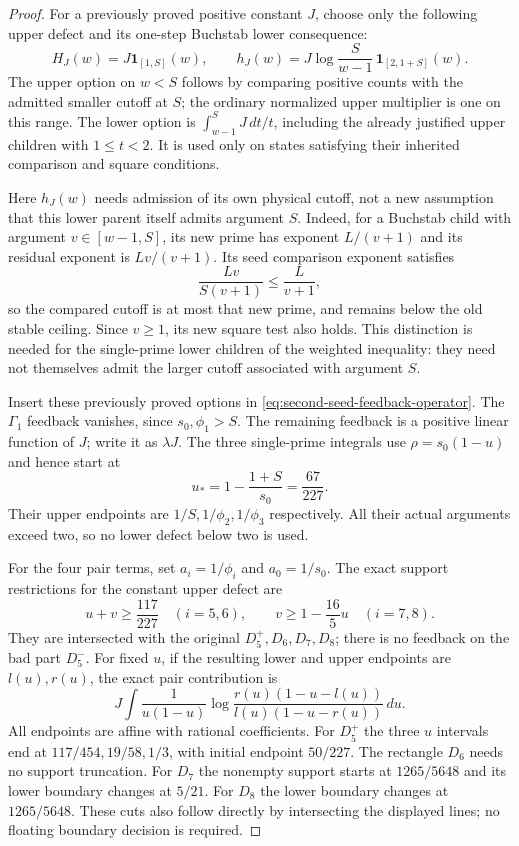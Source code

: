\begin{proof}
For a previously proved positive constant $J$, choose only the
following upper defect and its one-step Buchstab lower consequence:
\[
 H_J(w)=J\mathbf1_{[1,S]}(w),\qquad
 h_J(w)=J\log\frac{S}{w-1}\,\mathbf1_{[2,1+S]}(w).
\]
The upper option on $w<S$ follows by comparing positive counts
with the admitted smaller cutoff at $S$; the ordinary normalized
upper multiplier is one on this range. The lower option is
$\int_{w-1}^S J\,dt/t$, including the already justified upper
children with $1\le t<2$. It is used only on states satisfying
their inherited comparison and square conditions.

Here $h_J(w)$ needs admission of its own physical cutoff, not a
new assumption that this lower parent itself admits argument $S$.
Indeed, for a Buchstab child with argument $v\in[w-1,S]$, its new
prime has exponent $L/(v+1)$ and its residual exponent is
$Lv/(v+1)$. Its seed comparison exponent satisfies
\[
 \frac{Lv}{S(v+1)}\le\frac{L}{v+1},
\]
so the compared cutoff is at most that new prime, and remains
below the old stable ceiling. Since $v\ge1$, its new square test
also holds. This distinction is needed for the single-prime lower
children of the weighted inequality: they need not themselves
admit the larger cutoff associated with argument $S$.

Insert these previously proved options in
\eqref{eq:second-seed-feedback-operator}. The $\Gamma_1$ feedback
vanishes, since $s_0,\phi_1>S$. The remaining feedback is a positive
linear function of $J$; write it as $\lambda J$.
The three single-prime integrals use
$\rho=s_0(1-u)$ and hence start at
\[
 u_* = 1-\frac{1+S}{s_0}=\frac{67}{227}.
\]
Their upper endpoints are $1/S,1/\phi_2,1/\phi_3$ respectively.
All their actual arguments exceed two, so no lower defect below
two is used.

For the four pair terms, set $a_i=1/\phi_i$ and $a_0=1/s_0$.
The exact support restrictions for the constant upper defect are
\[
 u+v\ge\frac{117}{227}\quad(i=5,6),\qquad
 v\ge1-\frac{16}{5}u\quad(i=7,8).
\]
They are intersected with the original $D_5^+,D_6,D_7,D_8$;
there is no feedback on the bad part $D_5^-$.
For fixed $u$, if the resulting lower and upper endpoints are
$l(u),r(u)$, the exact pair contribution is
\[
 J\int \frac{1}{u(1-u)}
 \log\frac{r(u)(1-u-l(u))}{l(u)(1-u-r(u))}\,du.
\]
All endpoints are affine with rational coefficients. For $D_5^+$
the three $u$ intervals end at $117/454,19/58,1/3$, with initial
endpoint $50/227$. The rectangle $D_6$ needs no support truncation.
For $D_7$ the nonempty support starts at $1265/5648$ and its lower
boundary changes at $5/21$. For $D_8$ the lower boundary changes
at $1265/5648$. These cuts also follow directly by intersecting
the displayed lines; no floating boundary decision is required.


\end{proof}
